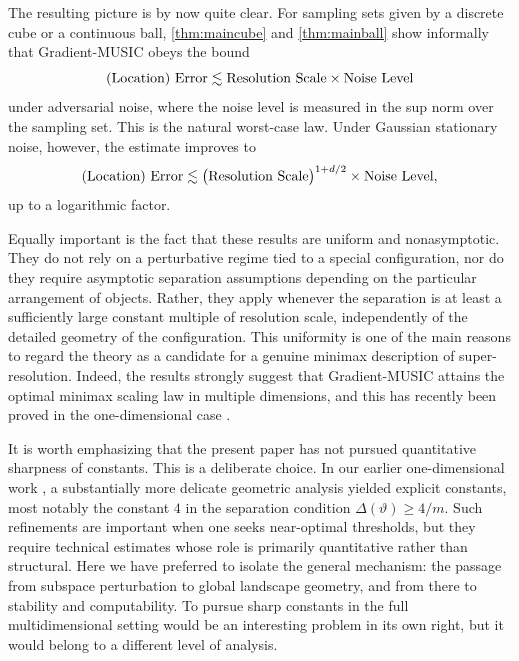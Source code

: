 \documentclass[11pt]{article}
\theoremstyle{definition}
\numberwithin{theorem}{section}
\numberwithin{lemma}{section}
\numberwithin{equation}{section}
\numberwithin{equation}{section}
\begin{document}
The resulting picture is by now quite clear. For sampling sets given by a discrete cube or a continuous ball, \cref{thm:maincube} and \cref{thm:mainball} show informally that Gradient-MUSIC obeys the bound
\begin{equation}
\label{eq:optimal}
\hbox{(Location) Error} \lesssim \hbox{Resolution Scale}\times \hbox{Noise Level}
\end{equation}
under adversarial noise, where the noise level is measured in the sup norm over the sampling set. This is the natural worst-case law. Under Gaussian stationary noise, however, the estimate improves to
\begin{equation}
\label{eq:supres}
\hbox{(Location) Error} \lesssim \big(\hbox{Resolution Scale}\big)^{1+d/2}\times \hbox{Noise Level},
\end{equation}
up to a logarithmic factor.

Equally important is the fact that these results are uniform and nonasymptotic. They do not rely on a perturbative regime tied to a special configuration, nor do they require asymptotic separation assumptions depending on the particular arrangement of objects. Rather, they apply whenever the separation is at least a sufficiently large constant multiple of resolution scale, independently of the detailed geometry of the configuration. This uniformity is one of the main reasons to regard the theory as a candidate for a genuine minimax description of super-resolution. Indeed, the results strongly suggest that Gradient-MUSIC attains the optimal minimax scaling law in multiple dimensions, and this has recently been proved in the one-dimensional case \cite{fannjiang2025optimality}.

It is worth emphasizing that the present paper has not pursued quantitative sharpness of constants. This is a deliberate choice. In our earlier one-dimensional work \cite{fannjiang2025optimality}, a substantially more delicate geometric analysis yielded explicit constants, most notably the constant $4$ in the separation condition $\Delta(\vartheta)\ge 4/m$. Such refinements are important when one seeks near-optimal thresholds, but they require technical estimates whose role is primarily quantitative rather than structural. Here we have preferred to isolate the general mechanism: the passage from subspace perturbation to global landscape geometry, and from there to stability and computability. To pursue sharp constants in the full multidimensional setting would be an interesting problem in its own right, but it would belong to a different level of analysis.
\end{document}
